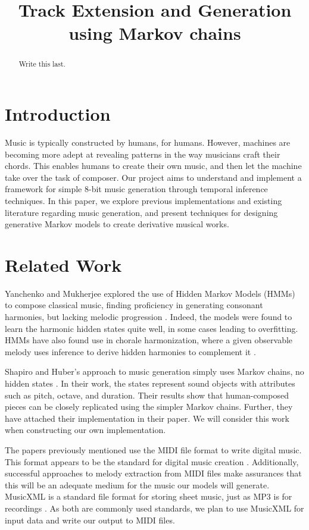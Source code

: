 \documentclass{article}
\title{Track Extension and Generation using Markov chains}
\begin{document}
\maketitle

\begin{abstract}
Write this last.
\end{abstract}

\section{Introduction}
Music is typically constructed by humans, for humans. However, machines are becoming more adept at revealing patterns in the way musicians craft their chords. 
This enables humans to create their own music, and then let the machine take over the task of composer. Our project aims to understand and implement a framework 
for simple 8-bit music generation through temporal inference techniques. In this paper, we explore previous implementations and existing literature regarding music 
generation, and present techniques for designing generative Markov models to create derivative musical works.

\section{Related Work}
Yanchenko and Mukherjee explored the use of Hidden Markov Models (HMMs) to compose classical music, finding proficiency in generating consonant harmonies, but 
lacking melodic progression \cite{yanchenko_2017}. Indeed, the models were found to learn the harmonic hidden states quite well, in some cases leading to overfitting. 
HMMs have also found use in chorale harmonization, where a given observable melody uses inference to derive hidden harmonies to complement it \cite{allan_2005}. 

Shapiro and Huber's approach to music generation simply uses Markov chains, no hidden states \cite{shapiro_huber_2021}. In their work, the states represent sound 
objects with attributes such as pitch, octave, and duration. Their results show that human-composed pieces can be closely replicated using the simpler Markov chains. 
Further, they have attached their implementation in their paper. We will consider this work when constructing our own implementation.

The papers previously mentioned use the MIDI file format to write digital music. This format appears to be the standard for digital music creation \cite{midi_format}. 
Additionally, successful approaches to melody extraction from MIDI files \cite{ozcan_2005} make assurances that this will be an adequate medium for the music our models 
will generate. MusicXML is a standard file format for storing sheet music, just as MP3 is for recordings \cite{musicxml_2022}. As both are commonly used standards, we 
plan to use MusicXML for input data and write our output to MIDI files.
\end{document}
